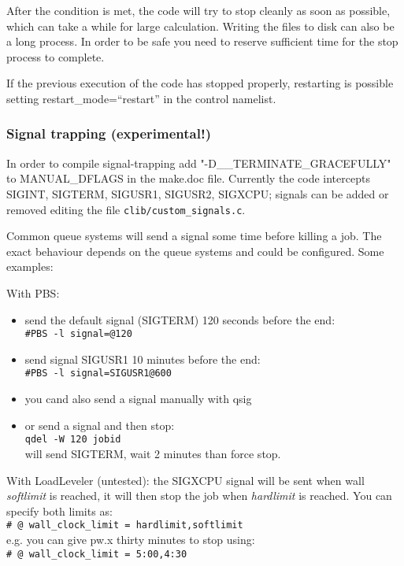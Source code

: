\documentclass[12pt,a4paper]{article}
\begin{document}
After the condition is met, the code will try to stop cleanly as soon as possible, which can take a while for large calculation. Writing the files to disk can also be a long process. In order to be safe you need to reserve sufficient time for the stop process to complete.

If the previous execution of the code has stopped properly, restarting is possible setting restart\_mode=``restart'' in the control namelist.

\subsubsection{Signal trapping (experimental!)}
In order to compile signal-trapping add \mbox{"-D\_\_TERMINATE\_GRACEFULLY"} to \mbox{MANUAL\_DFLAGS} in the make.doc file. Currently the code intercepts \mbox{SIGINT}, \mbox{SIGTERM}, \mbox{SIGUSR1}, \mbox{SIGUSR2}, \mbox{SIGXCPU}; signals can be added or removed editing the file {\tt clib/custom\_signals.c}.

Common queue systems will send a signal some time before killing a job. The exact behaviour depends on the queue systems and could be configured. Some examples:
  
With PBS:
\begin{itemize}
  \item send the default signal (\mbox{SIGTERM}) 120 seconds before the end:\\
  {\tt \#PBS -l signal=@120}

  \item send signal SIGUSR1 10 minutes before the end:\\
  {\tt \#PBS -l signal=SIGUSR1@600}

  \item you cand also send a signal manually with qsig
  \item or send a signal and then stop:\\
   {\tt qdel -W 120 jobid}\\
  will send SIGTERM, wait 2 minutes than force stop.
\end{itemize}

With LoadLeveler (untested): the \mbox{SIGXCPU} signal will be sent when wall \emph{softlimit} is reached, it will then stop the job when \emph{hardlimit} is reached. You can specify both limits as:\\
  {\tt \# @ wall\_clock\_limit = hardlimit,softlimit}\\
    e.g. you can give pw.x thirty minutes to stop using:\\
  {\tt \# @ wall\_clock\_limit = 5:00,4:30}\\
\end{document}
